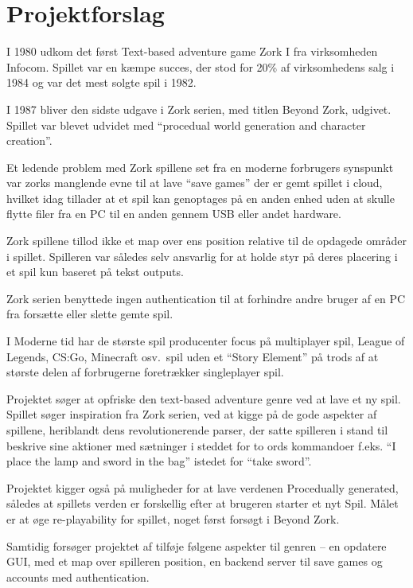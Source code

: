\section{Projektforslag}

I 1980 udkom det først Text-based adventure game Zork I
fra virksomheden Infocom\cite{WikiZork}. Spillet var en
kæmpe succes, der stod for 20\% af virksomhedens salg i
1984 og var det mest solgte spil i 1982\cite{WikiZork}.

I 1987 bliver den sidste udgave i Zork serien, med titlen
Beyond Zork, udgivet\cite{WikiBeyondZork}.%
Spillet var blevet udvidet med  ``procedual world generation and character creation''\cite{WikiBeyondZork}.

\vspace{0.7em}

\noindent Et ledende problem med Zork spillene set fra en moderne 
forbrugers synspunkt var zorks manglende evne til at lave
``save games'' der er gemt spillet i cloud, hvilket idag tillader
at et spil kan genoptages på en anden enhed uden at skulle
flytte filer fra en PC til en anden gennem USB eller andet hardware. 

Zork spillene tillod ikke et map over ens position relative til
de opdagede områder i spillet. Spilleren var således selv ansvarlig
for at holde styr på deres placering i et spil kun baseret på 
tekst outputs.

Zork serien benyttede ingen authentication til at forhindre andre
bruger af en PC fra forsætte eller slette gemte spil.

\vspace{0.7 em}

\noindent I Moderne tid har de største spil producenter focus 
på multiplayer spil, League of Legends, CS:Go, Minecraft osv.\
spil uden et ``Story Element'' på trods af at største delen
af forbrugerne foretrækker singleplayer spil\cite{Statista}.

\vspace{0.7em}

\noindent Projektet søger at opfriske den text-based adventure genre
ved at lave et ny spil.
Spillet søger inspiration fra Zork serien, ved at kigge på
de gode aspekter af spillene, heriblandt dens revolutionerende
parser, der satte spilleren i stand til beskrive sine
aktioner med sætninger i steddet for to ords kommandoer f.eks.
``I place the lamp and sword in the bag'' istedet for ``take sword''\cite{WikiZork}.

Projektet kigger også på muligheder for at lave verdenen Procedually generated,
således at spillets verden er forskellig efter at brugeren starter
et nyt Spil. Målet er at øge re-playability for spillet,
noget først forsøgt i Beyond Zork\cite{WikiBeyondZork}.

Samtidig forsøger projektet af tilføje følgene aspekter til genren --%
en opdatere GUI, med et map over spilleren position, en backend server
til save games og accounts med authentication. 

\newpage
